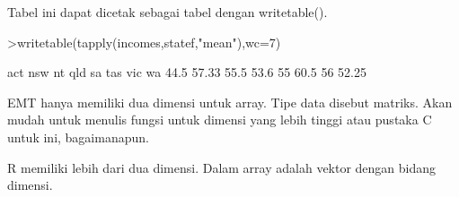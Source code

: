 \documentclass[a4paper,10pt]{article}
\begin{document}
\begin{eulernotebook}
\begin{eulercomment}
\begin{eulercomment}
\begin{eulercomment}
\begin{eulercomment}
\begin{eulercomment}
Tabel ini dapat dicetak sebagai tabel dengan writetable().
\end{eulercomment}
\begin{eulerprompt}
>writetable(tapply(incomes,statef,"mean"),wc=7)
\end{eulerprompt}
\begin{euleroutput}
      act    nsw     nt    qld     sa    tas    vic     wa
     44.5  57.33   55.5   53.6     55   60.5     56  52.25
\end{euleroutput}
\begin{eulercomment}
EMT hanya memiliki dua dimensi untuk array. Tipe data disebut matriks.
Akan mudah untuk menulis fungsi untuk dimensi yang lebih tinggi atau
pustaka C untuk ini, bagaimanapun.

R memiliki lebih dari dua dimensi. Dalam array adalah vektor dengan
bidang dimensi.


\end{eulercomment}
\end{eulercomment}
\end{eulercomment}
\end{eulercomment}
\end{eulercomment}
\end{eulernotebook}
\end{document}
